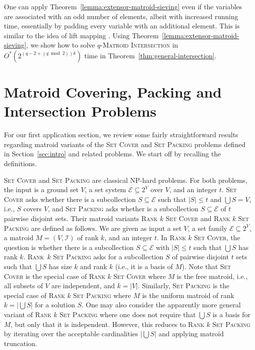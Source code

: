 \documentclass{theoretics}
\newcommand{\cI}{\ensuremath{\mathcal I}\xspace}
\newcommand{\cE}{\ensuremath{\mathcal E}\xspace}
\begin{document}
One can apply Theorem~\ref{lemma:extensor-matroid-sieving} even if the variables are associated with an odd number of elements, albeit with increased running time, essentially by padding every variable with an additional element.
This is similar to the idea of lift mapping \cite{BrandDH18}.
Using Theorem~\ref{lemma:extensor-matroid-sieving}, we show how to solve \textsc{$q$-Matroid Intersection} in $O^*(2^{(q-2+(q \bmod 2))k})$ time in Theorem~\ref{thm:general-intersection}.

\section{Matroid Covering, Packing and Intersection Problems}
\label{sec:matroid-applications}

For our first application section, we review some fairly
straightforward results regarding matroid variants of the
\textsc{Set Cover} and \textsc{Set Packing} problems defined in Section~\ref{sec:intro} and related problems.
We start off by recalling the definitions.

\textsc{Set Cover} and \textsc{Set Packing} are classical NP-hard problems.
For both problems, the input is a ground set $V$, a set system $\cE \subseteq 2^V$ over $V$, and an integer $t$.
\textsc{Set Cover} asks whether there is a
subcollection $S \subseteq \cE$ such that $|S| \le t$ and $\bigcup S=V$,
i.e., $S$ covers $V$, and
\textsc{Set Packing} asks whether is a subcollection $S \subseteq \cE$ of $t$ pairwise disjoint sets.
Their matroid variants \textsc{Rank $k$ Set Cover} and \textsc{Rank $k$ Set Packing} are defined as follows.
We are given as input a set $V$, a set family $\cE \subseteq 2^V$, a matroid $M = (V, \cI)$ of rank $k$, and an integer $t$.
In \textsc{Rank $k$ Set Cover}, the question is whether there is a subcollection $S \subseteq \cE$ with $|S| \le t$ such that  $\bigcup S$ has rank $k$.
\textsc{Rank~$k$ Set Packing} asks for a subcollection $S$ of pairwise disjoint $t$ sets such that $\bigcup S$ has size $k$ and rank $k$ (i.e., it is a basis of $M$).
Note that \textsc{Set Cover} is the special case of \textsc{Rank $k$ Set Cover} where $M$ is the free matroid, i.e., all subsets of $V$ are independent, and $k = |V|$.
Similarly, \textsc{Set Packing} is the special case of \textsc{Rank $k$ Set Packing} where $M$ is the uniform matroid of rank $k = |\bigcup S|$ for a solution $S$.
One may also consider the apparently more general variant of \textsc{Rank $k$ Set Packing} where one does not require that $\bigcup S$ is a basis for $M$, but only that it is independent. 
However, this reduces to \textsc{Rank $k$ Set Packing} by iterating over the acceptable cardinalities $|\bigcup S|$ and applying matroid truncation.
\end{document}
